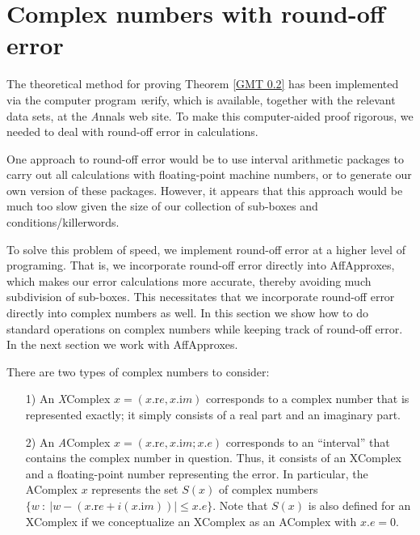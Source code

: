\chapter{Complex numbers with round-off error}


\begin{remark} \label{GMT remark7.1}
The theoretical method for proving Theorem \ref{GMT 0.2}
has been implemented via the computer program {\textit verify}, which is available, together with the relevant data sets, at the {\textit Annals} web site.  To make this computer-aided proof rigorous, we needed to deal with round-off error in calculations.  

One approach to round-off error would be to use interval arithmetic packages to carry out all calculations with floating-point machine numbers, or to generate our own version of these packages.  
However, it appears that this approach
would be much too slow given the size of our collection of sub-boxes and conditions/killerwords.  

To solve this problem of speed, we implement round-off error at a higher level of programing.  That is, we incorporate round-off error directly
 into AffApproxes,  which makes our error calculations more accurate, thereby avoiding much subdivision of
sub-boxes. This necessitates that we incorporate round-off error directly into complex numbers as well. 
In this section we show how to do standard operations on complex numbers while keeping track of round-off error.
In the next section we work with  AffApproxes.\end{remark}

\begin{definition}\label{GMT def7.2}
There are two types of complex numbers to consider: 

\begin{itemize}
\item[1)]  An {\textit XComplex} $x = (x.{\mathrm re}, x.{\mathrm im})$ corresponds to a complex number that is represented exactly; it
simply consists of a real part and an imaginary part.

\item[2)]  An {\textit AComplex} $x = (x.{\mathrm re}, x.{\mathrm im}; x.e)$ corresponds to an ``interval'' that contains the complex number in
question.  Thus, it consists of an XComplex and a floating-point number representing the error.  In particular, the AComplex
$x$ represents the set $S(x)$ of complex numbers 
$\{w\ :\ |w - (x.{\mathrm re} + i (x.{\mathrm im}))| \le x.e\}$.  Note that $S(x)$ is also defined
for an XComplex if we conceptualize an XComplex as an AComplex with
$x.e = 0.$
\end{itemize}

\end{definition}

